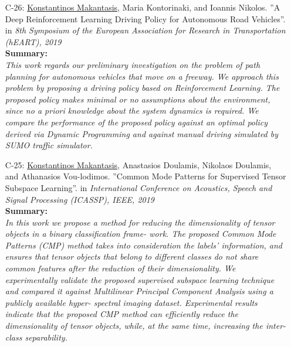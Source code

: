 \documentclass[a4paper,10pt]{article}
\begin{document}
\begin{itemize}
	\item [C-26:]\underline{Konstantinos Makantasis}, Maria Kontorinaki, and Ioannis Nikolos. ''A Deep Reinforcement Learning Driving Policy for Autonomous Road Vehicles''. in \textit{8th Symposium of the European Association for Research in Transportation (hEART), 2019}\\
	\textbf{Summary:}\\
	\textit{This work regards our preliminary investigation on the problem of path planning for autonomous vehicles that move on a freeway. We approach this problem by proposing a driving policy based on Reinforcement Learning. The proposed policy makes minimal or no assumptions about the environment, since no \textit{a priori} knowledge about the system dynamics is required. We compare the performance of the proposed policy against an optimal policy derived via Dynamic Programming and against manual driving simulated by SUMO traffic simulator.}
	
	\item [C-25:]\underline{Konstantinos Makantasis}, Anastasios Doulamis, Nikolaos Doulamis, and Athanasios Vou-lodimos. ''Common Mode Patterns for Supervised Tensor Subspace Learning''. in \textit{International Conference on Acoustics, Speech and Signal Processing (ICASSP), IEEE, 2019}\\
	\textbf{Summary:}\\
	\textit{In this work we propose a method for reducing the dimensionality of tensor objects in a binary classification frame- work. The proposed Common Mode Patterns (CMP) method takes into consideration the labels’ information, and ensures that tensor objects that belong to different classes do not share common features after the reduction of their dimensionality. We experimentally validate the proposed supervised subspace learning technique and compared it against Multilinear Principal Component Analysis using a publicly available hyper- spectral imaging dataset. Experimental results indicate that the proposed CMP method can efficiently reduce the dimensionality of tensor objects, while, at the same time, increasing the inter-class separability.}
	

\end{itemize}
\end{document}
